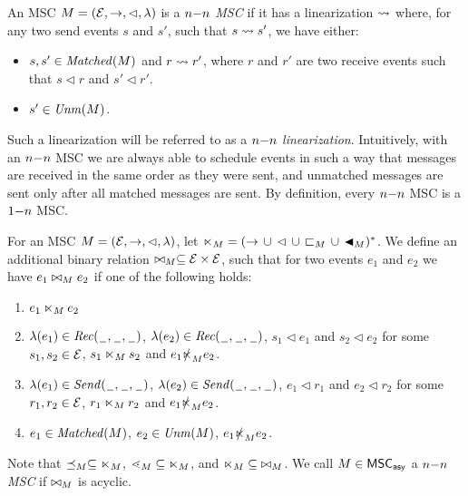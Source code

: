 \begin{definition}[$\nn$ MSC]%
	An MSC $M = (\mathcal{E},\to,\lhd,\lambda)$ is a \emph{$\nn$ MSC} if it has a linearization $\rightsquigarrow$ where, for any two send events $s$ and $s'$, such that $s \rightsquigarrow s'$, we have either:
	\begin{itemize}\itemsep=0.5ex
		\item $s,s' \in \mathit{Matched}(M)$ and $r \rightsquigarrow r'$, where $r$ and $r'$ are two receive events such that $s \lhd r$ and $s' \lhd r'$.
		\item $s' \in \mathit{Unm}(M)$.
	\end{itemize}
\end{definition}

Such a linearization will be referred to as a \emph{$\nn$ linearization}. Intuitively, with an $\nn$ MSC we are always able to schedule events in such a way that messages are received in the same order as they were sent, and unmatched messages are sent only after all matched messages are sent. By definition, every $\nn$ MSC is a $1\mathsf{-}n$ MSC. 

\begin{definition} [$\nn$ alternative]%
For an MSC $M = (\mathcal{E},\to,\lhd,\lambda)$, let ${\ltimes}_M = ({\to} \,\cup\, {\lhd} \,\cup\, {\sqsubset_M} \,\cup\, {\blacktriangleleft_M})^\ast$. We define an additional binary relation $\bowtie_M \subseteq \mathcal{E} \times \mathcal{E}$, such that for two events $e_1$ and $e_2$ we have $e_1 \bowtie_M e_2$ if one of the following holds:
\begin{enumerate}\itemsep=0.5ex
	\item $e_1 \ltimes_M e_2$
	\item $\lambda(e_1) \in {\mathit{Rec}(\hspace{0.1em}\underline{\hspace{0.5em}}\hspace{0.1em},\hspace{0.1em}\underline{\hspace{0.5em}}\hspace{0.1em},\hspace{0.1em}\underline{\hspace{0.5em}}\hspace{0.1em})}$, $\lambda(e_2) \in {\mathit{Rec}(\hspace{0.1em}\underline{\hspace{0.5em}}\hspace{0.1em},\hspace{0.1em}\underline{\hspace{0.5em}}\hspace{0.1em},\hspace{0.1em}\underline{\hspace{0.5em}}\hspace{0.1em})}$, $s_1 \lhd e_1$ and $s_2 \lhd e_2$ for some $s_1,s_2 \in \mathcal{E}$, $s_1 \ltimes_M s_2$ and $e_1 \slashed{\ltimes}_M e_2$.
	\item $\lambda(e_1) \in {\mathit{Send}(\hspace{0.1em}\underline{\hspace{0.5em}}\hspace{0.1em},\hspace{0.1em}\underline{\hspace{0.5em}}\hspace{0.1em},\hspace{0.1em}\underline{\hspace{0.5em}}\hspace{0.1em})}$, $\lambda(e_2) \in {\mathit{Send}(\hspace{0.1em}\underline{\hspace{0.5em}}\hspace{0.1em},\hspace{0.1em}\underline{\hspace{0.5em}}\hspace{0.1em},\hspace{0.1em}\underline{\hspace{0.5em}}\hspace{0.1em})}$, $e_1 \lhd r_1$ and $e_2 \lhd r_2$ for some $r_1,r_2 \in \mathcal{E}$, $r_1 \ltimes_M r_2$ and $e_1 \slashed{\ltimes}_M e_2$.
	\item $e_1 \in \mathit{Matched}(M)$, $e_2 \in \mathit{Unm}(M)$, $e_1 \slashed{\ltimes}_M e_2$.
\end{enumerate}

Note that $\preceq_M \subseteq \ltimes_M$, $\lessdot_M \subseteq \ltimes_M$, and $\ltimes_M \subseteq\; \bowtie_M$. We call $M \in \mathsf{MSC}_{\mathsf{asy}}$ a \emph{$\nn$ MSC}
if ${\bowtie_M}$ is acyclic.
\end{definition}

